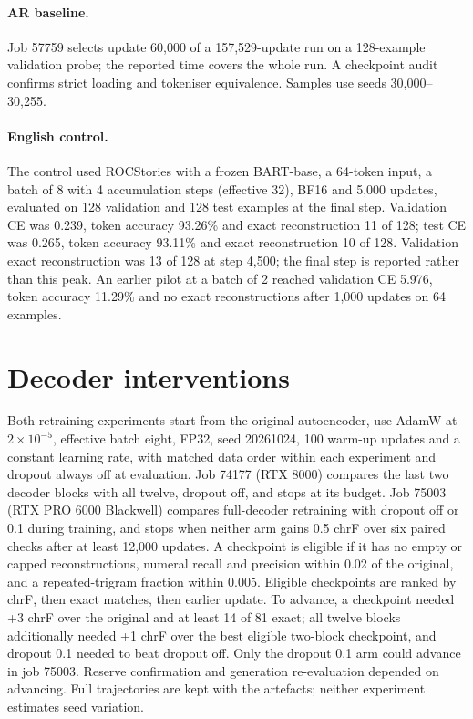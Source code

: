 \documentclass[11pt,a4paper]{article}
\begin{document}
\paragraph{AR baseline.} Job 57759 selects update 60,000 of a 157,529-update run on a 128-example validation probe; the reported time covers the whole run. A checkpoint audit confirms strict loading and tokeniser equivalence. Samples use seeds 30,000--30,255.

\paragraph{English control.} The control used ROCStories with a frozen BART-base, a 64-token input, a batch of 8 with 4 accumulation steps (effective 32), BF16 and 5,000 updates, evaluated on 128 validation and 128 test examples at the final step. Validation CE was 0.239, token accuracy 93.26\% and exact reconstruction 11 of 128; test CE was 0.265, token accuracy 93.11\% and exact reconstruction 10 of 128. Validation exact reconstruction was 13 of 128 at step 4,500; the final step is reported rather than this peak. An earlier pilot at a batch of 2 reached validation CE 5.976, token accuracy 11.29\% and no exact reconstructions after 1,000 updates on 64 examples.

\section{Decoder interventions}
\label{app:interventions}

Both retraining experiments start from the original autoencoder, use AdamW at $2\times10^{-5}$, effective batch eight, FP32, seed 20261024, 100 warm-up updates and a constant learning rate, with matched data order within each experiment and dropout always off at evaluation. Job 74177 (RTX 8000) compares the last two decoder blocks with all twelve, dropout off, and stops at its budget. Job 75003 (RTX PRO 6000 Blackwell) compares full-decoder retraining with dropout off or 0.1 during training, and stops when neither arm gains 0.5 chrF over six paired checks after at least 12,000 updates. A checkpoint is eligible if it has no empty or capped reconstructions, numeral recall and precision within 0.02 of the original, and a repeated-trigram fraction within 0.005. Eligible checkpoints are ranked by chrF, then exact matches, then earlier update. To advance, a checkpoint needed +3 chrF over the original and at least 14 of 81 exact; all twelve blocks additionally needed +1 chrF over the best eligible two-block checkpoint, and dropout 0.1 needed to beat dropout off. Only the dropout 0.1 arm could advance in job 75003. Reserve confirmation and generation re-evaluation depended on advancing. Full trajectories are kept with the artefacts; neither experiment estimates seed variation.
\end{document}
